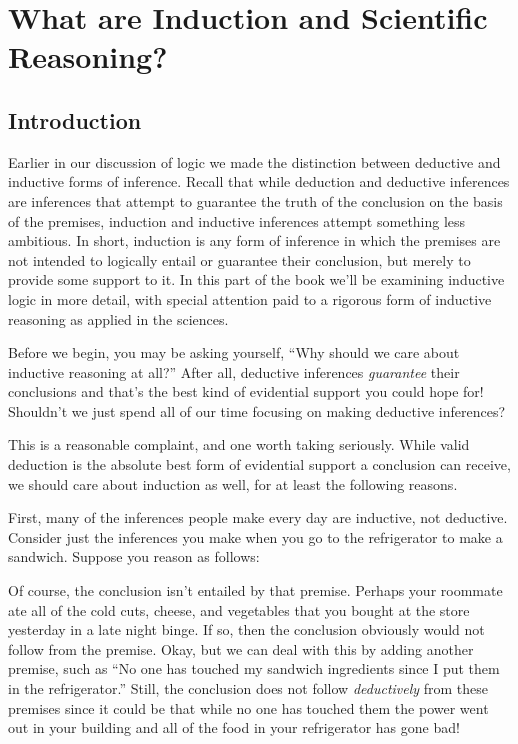 \chapter{What are Induction and Scientific Reasoning?}
\label{ch:inductionandscience}
\setlength{\parindent}{1em}

\section{Introduction}

Earlier in our discussion of logic we made the distinction between deductive and inductive forms of inference. Recall that while deduction and deductive inferences are inferences that attempt to guarantee the truth of the conclusion on the basis of the premises, induction and inductive inferences attempt something less ambitious. In short, induction is any form of inference in which the premises are not intended to logically entail or guarantee their conclusion, but merely to provide some support to it. In this part of the book we'll be examining inductive logic in more detail, with special attention paid to a rigorous form of inductive reasoning as applied in the sciences.

Before we begin, you may be asking yourself, ``Why should we care about inductive reasoning at all?'' After all, deductive inferences \emph{guarantee} their conclusions and that's the best kind of evidential support you could hope for! Shouldn't we just spend all of our time focusing on making deductive inferences?

This is a reasonable complaint, and one worth taking seriously. While valid deduction is the absolute best form of evidential support a conclusion can receive, we should care about induction as well, for at least the following reasons.

First, many of the inferences people make every day are inductive, not deductive. Consider just the inferences you make when you go to the refrigerator to make a sandwich. Suppose you reason as follows:

\begin{kormanize}
\end{kormanize}

Of course, the conclusion isn't entailed by that premise. Perhaps your roommate ate all of the cold cuts, cheese, and vegetables that you bought at the store yesterday in a late night binge. If so, then the conclusion obviously would not follow from the premise. Okay, but we can deal with this by adding another premise, such as ``No one has touched my sandwich ingredients since I put them in the refrigerator.'' Still, the conclusion does not follow \emph{deductively} from these premises since it could be that while no one has touched them the power went out in your building and all of the food in your refrigerator has gone bad!

